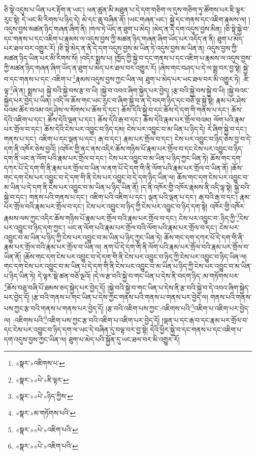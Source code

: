 ཅི་སྟེ་འདུས་པ་ཡིན་པར་རྟོག་ན་ཡང་། ཕན་ཚུན་མི་མཐུན་པ་དེ་དག་གཅིག་ལ་དུས་གཅིག་ཏུ་ཚོགས་པར་ཇི་ལྟར་རུང་སྟེ། དེ་ཡང་མི་རིགས་པ་ཉིད་དེ། མེ་དང་ཆུ་བཞིན་ནོ། །ཡང་གཞན་ཡང་། སྐྱེ་དང་གནས་དང་འཇིག་རྣམས་ལ། །འདུས་བྱས་མཚན་ཉིད་གཞན་ཞིག་ནི། །གལ་ཏེ་ཡོད་ན་ཐུག་པ་མེད། །མེད་ན་དེ་དག་འདུས་བྱས་མིན། །ཅི་སྟེ་སྐྱེ་བ་དང་གནས་པ་དང་འཇིག་པ་རྣམས་ལ་འདུས་བྱས་ཀྱི་མཚན་ཉིད་གཞན་ཞིག་ཡོད་པར་འདོད་ན་ནི། ཐུག་པ་མེད་པར་ཐལ་བར་འགྱུར་རོ། །ཅི་སྟེ་མེད་ན་ནི་དེ་དག་འདུས་བྱས་མ་ཡིན་ཏེ་འདུས་བྱས་མ་ཡིན་ན། འདུས་བྱས་ཀྱི་མཚན་ཉིད་ཡིན་པར་མི་རིགས་སོ། །འདིར་སྨྲས་པ། །ཁྱོད་ཀྱི་སྐྱེ་བ་དང་གནས་པ་དང་འཇིག་པ་རྣམས་ལ་འདུས་བྱས་ཀྱི་མཚན་ཉིད་གཞན་ཞིག་ཡོད་ན་ཐུག་པ་མེད་པར་ཐལ་བར་འགྱུར་རོ། །ཞེས་གང་བཤད་པ་དེ་ལ་སྨྲ་བར་བྱ་སྟེ། སྐྱེ་བ་དང་གནས་པ་དང་:འཇིག་པ་\footnote{«སྣར་»འཇིགས་པ་}རྣམས་འདུས་བྱས་ཀྱང་ཡིན་ལ། ཐུག་པ་མེད་པར་ཡང་ཐལ་བར་མི་འགྱུར་ཏེ། :ཇི་ལྟ་\footnote{«སྣར་»«པེ་»ཇི་ལྟར་}ཞེ་ན། སྨྲས་པ། སྐྱེ་བའི་སྐྱེ་བས་རྩ་བ་ཡི། །སྐྱེ་བ་འབའ་ཞིག་སྐྱེད་པར་བྱེད། །རྩ་བའི་སྐྱེ་བས་སྐྱེ་བ་ཡི། །སྐྱེ་བའང་སྐྱེད་པར་བྱེད་པ་ཡིན། །འདི་ལ་ཆོས་གང་ཡང་རུང་བ་ཞིག་སྐྱེ་བ་ན་དེ་བདག་ཉིད་དང་བཅོ་ལྔ་སྐྱེ་སྟེ། རྣམ་པར་ཤེས་པའམ་ཚོར་བའམ་འདུ་ཤེས་ལ་སོགས་པ་ཆོས་དེ་དང་། ཆོས་དེའི་སྐྱེ་བ་དང་ཆོས་དེ་དག་གི་གནས་པ་དང་། ཆོས་དེའི་འཇིག་པ་དང་། ཆོས་དེའི་ལྡན་པ་དང་། ཆོས་དེའི་རྒ་བ་དང་། ཆོས་དེའི་རྣམ་པར་གྲོལ་བའམ། ལོག་པའི་རྣམ་པར་གྲོལ་བ་དང་། ཆོས་དེའི་ངེས་པར་འབྱུང་བ་ཉིད་དམ། ངེས་པར་འབྱུང་བ་མ་ཡིན་པ་ཉིད་དེ། རེ་ཞིག་སྐྱེ་བ་དང་། གནས་པ་དང་། འཇིག་པ་དང་ལྡན་པ་དང་། རྒ་བ་དང་། རྣམ་པར་གྲོལ་བ་དང་། ངེས་པར་འབྱུང་བ་ཉིད་ཅེས་བྱ་བ་དེ་དག་ནི་འཁོར་ཅེས་བྱའོ། །འཁོར་གྱི་ནང་ནས་འདིར་ཆོས་གཉིས་པོ་རྣམ་པར་གྲོལ་བ་དང་ངེས་པར་འབྱུང་བ་ཉིད་དག་ནི་ཡང་ན་ལོག་པའི་རྣམ་པར་གྲོལ་བ་དང་། ངེས་པར་འབྱུང་བ་མ་ཡིན་པ་ཉིད་ཀྱང་ཡིན་ཏེ། ཆོས་གང་དག་དཀར་པོ་དེ་དག་གི་ནི་རྣམ་པར་གྲོལ་བ་ཡིན་ལ་ནག་པོ་དེ་དག་གི་ནི་ལོག་པའི་རྣམ་པར་གྲོལ་བ་ཡིན་ནོ། །ཆོས་གང་དག་ངེས་པར་འབྱུང་བ་དེ་དག་གི་ནི་ངེས་པར་འབྱུང་བ་དེ་དག་ཉིད་ཡིན་ལ། ཆོས་གང་དག་ངེས་པར་འབྱུང་བ་མ་ཡིན་པ་དེ་དག་ནི་ངེས་པར་འབྱུང་བ་མ་ཡིན་པ་ཉིད་ཡིན་ནོ། །ད་ནི་འཁོར་གྱི་འཁོར་རྣམས་ནི་འདི་ལྟ་སྟེ། སྐྱེ་བའི་སྐྱེ་བ་དང་། གནས་པའི་གནས་པ་དང་། འཇིག་པའི་འཇིག་པ་དང་། ལྡན་པའི་ལྡན་པ་དང་། རྒ་བའི་རྒ་བ་དང་། རྣམ་པར་གྲོལ་བའི་རྣམ་པར་གྲོལ་བ་དང་། ངེས་པར་འབྱུང་བ་ཉིད་ཀྱི་ངེས་པར་འབྱུང་བ་ཉིད་དག་སྟེ། འཁོར་གྱི་འཁོར་རྣམས་ལས་ཀྱང་འདིར་ཆོས་གཉིས་པོ་རྣམ་པར་གྲོལ་བའི་རྣམ་པར་གྲོལ་བ་དང་། ངེས་པར་འབྱུང་བ་:ཉིད་ཀྱི་\footnote{«སྣར་»«པེ་»ཉིད་ཀྱིས་}ངེས་པར་འབྱུང་བ་ཉིད་དག་ཀྱང་། ཡང་ན་ལོག་པའི་རྣམ་པར་གྲོལ་བའི་ལོག་པའི་རྣམ་པར་གྲོལ་བ་དང་། ངེས་པར་འབྱུང་བ་མ་ཡིན་པ་ཉིད་ཀྱི་ངེས་པར་འབྱུང་བ་མ་ཡིན་པ་ཉིད་ཀྱང་ཡིན་ཏེ། ཆོས་གང་དག་དཀར་པོ་དེ་དག་གི་ནི་རྣམ་པར་གྲོལ་བའི་རྣམ་པར་གྲོལ་བ་ཡིན་ལ། ནག་པོ་དེ་དག་གི་ནི་ལོག་པའི་རྣམ་པར་གྲོལ་བའི་རྣམ་པར་གྲོལ་བ་ཡིན་ནོ། །ཆོས་གང་དག་ངེས་པར་འབྱུང་བ་དེ་དག་གི་ནི་ངེས་པར་འབྱུང་བ་ཉིད་ཀྱི་ངེས་པར་འབྱུང་བ་ཉིད་ཡིན་ལ། གང་དག་ངེས་པར་འབྱུང་བ་མ་ཡིན་པ་དེ་དག་གི་ནི་ངེས་པར་འབྱུང་བ་མ་ཡིན་པ་ཉིད་ཀྱི་ངེས་པར་འབྱུང་བ་མ་ཡིན་པ་ཉིད་ཡིན་ཏེ། དེ་ལྟར་སྡེ་ཚན་བཅོ་ལྔའོ། །དེ་ལ་རྩ་བའི་སྐྱེ་བ་གང་ཡིན་པ་དེས་ནི་བདག་ཉིད་:མ་གཏོགས་པར་\footnote{«སྣར་»མ་གཏོགས་པའི་}ཆོས་བཅུ་བཞི་པོ་ཐམས་ཅད་སྐྱེད་པར་བྱེད་དོ། །སྐྱེ་བའི་སྐྱེ་བ་གང་ཡིན་པ་དེས་ནི་རྩ་བའི་སྐྱེ་བ་དེ་འབའ་ཞིག་སྐྱེད་པར་བྱེད་དོ། །རྩ་བའི་གནས་པ་གང་ཡིན་པ་དེས་ཀྱང་གནས་པའི་གནས་པ་གནས་པར་བྱེད་ལ། གནས་པའི་གནས་པས་ཀྱང་རྩ་བའི་གནས་པ་གནས་པར་བྱེད་དོ། །རྩ་བའི་འཇིག་པས་ཀྱང་:འཇིགས་པའི་\footnote{«སྣར་»«པེ་»འཇིག་པའི་}འཇིག་པ་འཇིག་པར་བྱེད་ལ། :འཇིགས་པའི་\footnote{«སྣར་»«པེ་»འཇིག་པའི་}འཇིག་པས་ཀྱང་རྩ་བའི་འཇིག་པ་འཇིག་པར་བྱེད་དོ། །ལྡན་པ་དང་རྒ་བ་དང་རྣམ་པར་གྲོལ་བ་དང་ངེས་པར་འབྱུང་བ་ཉིད་དག་ལ་ཡང་དེ་བཞིན་དུ་བལྟ་བར་བྱ་སྟེ། དེའི་ཕྱིར་སྐྱེ་བ་དང་གནས་པ་དང་འཇིག་པ་དག་འདུས་བྱས་ཀྱང་ཡིན་ལ། ཐུག་པ་མེད་པའི་སྐྱོན་དུ་ཡང་ཐལ་བར་མི་འགྱུར་རོ། 